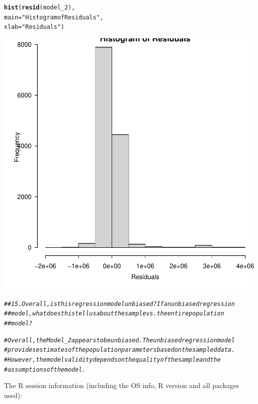 \documentclass{article}\usepackage[]{graphicx}\usepackage[]{xcolor}
\makeatletter
\newcommand{\hlstr}[1]{\textcolor[rgb]{0.192,0.494,0.8}{#1}}%
\newcommand{\hlcom}[1]{\textcolor[rgb]{0.678,0.584,0.686}{\textit{#1}}}%
\newcommand{\hlstd}[1]{\textcolor[rgb]{0.345,0.345,0.345}{#1}}%
\newcommand{\hlkwc}[1]{\textcolor[rgb]{0.333,0.667,0.333}{#1}}%
\newcommand{\hlkwd}[1]{\textcolor[rgb]{0.737,0.353,0.396}{\textbf{#1}}}%
\newenvironment{kframe}{%
 \def\at@end@of@kframe{}%
 \ifinner\ifhmode%
  \def\at@end@of@kframe{\end{minipage}}%
  \begin{minipage}{\columnwidth}%
 \fi\fi%
 \def\FrameCommand##1{\hskip\@totalleftmargin \hskip-\fboxsep
 \colorbox{shadecolor}{##1}\hskip-\fboxsep
     \hskip-\linewidth \hskip-\@totalleftmargin \hskip\columnwidth}%
 \MakeFramed {\advance\hsize-\width
   \@totalleftmargin\z@ \linewidth\hsize
   \@setminipage}}%
 {\par\unskip\endMakeFramed%
 \at@end@of@kframe}
\newenvironment{knitrout}{}{} %
\makeatother
\begin{document}
\begin{knitrout}
{}


\begin{kframe}\begin{alltt}
\hlkwd{hist}\hlstd{(}\hlkwd{resid}\hlstd{(model_2),}
     \hlkwc{main} \hlstd{=} \hlstr{"Histogram of Residuals"}\hlstd{,}
     \hlkwc{xlab} \hlstd{=} \hlstr{"Residuals"}\hlstd{)}
\end{alltt}
\end{kframe}

{\centering \includegraphics[width=.6\linewidth]{figure/assignment-8-2-Reppeto-Brian-Rnwauto-report-4} 

}


\begin{kframe}\begin{alltt}
\hlcom{## 15. Overall, is this regression model unbiased? If an unbiased regression }
\hlcom{## model, what does this tell us about the sample vs. the entire population }
\hlcom{## model?}

\hlcom{# Overall, the Model_2 appears to be unbiased. The unbiased regression model }
\hlcom{# provides estimates of the population parameters based on the sampled data.}
\hlcom{# However, the model validity depends on the quality of the sample and the }
\hlcom{# assumptions of the model. }
\end{alltt}
\end{kframe}
\end{knitrout}

The R session information (including the OS info, R version and all
packages used):
\end{document}
